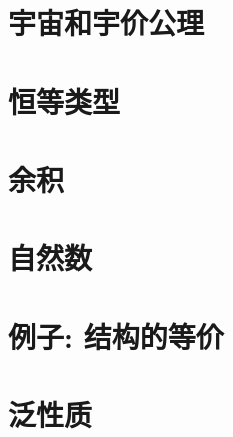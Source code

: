 \section{宇宙和宇价公理}
\label{sec:compute-universe}


\section{恒等类型}
\label{sec:compute-paths}


\section{余积}
\label{sec:compute-coprod}


\section{自然数}
\label{sec:compute-nat}


\section{例子: 结构的等价}
\label{sec:equality-of-structures}


\section{泛性质}
\label{sec:universal-properties}





